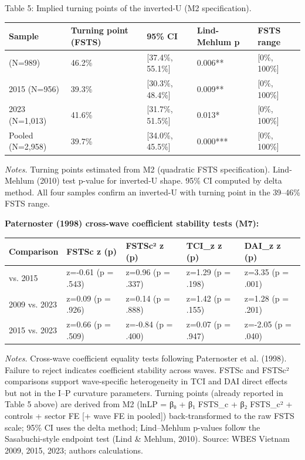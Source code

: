 \documentclass[12pt,a4paper]{article}
\begin{document}
Table 5: Implied turning points of the inverted-U (M2 specification).

\begin{longtable}[]{@{}lllll@{}}
\toprule\noalign{}
Sample & Turning point (FSTS) & 95\% CI & Lind-Mehlum p & FSTS range \\
\midrule\noalign{}
\endhead
\bottomrule\noalign{}
\endlastfoot
2009 (N=989) & 46.2\% & {[}37.4\%, 55.1\%{]} & 0.006** & {[}0\%,
100\%{]} \\
2015 (N=956) & 39.3\% & {[}30.3\%, 48.4\%{]} & 0.009** & {[}0\%,
100\%{]} \\
2023 (N=1,013) & 41.6\% & {[}31.7\%, 51.5\%{]} & 0.013* & {[}0\%,
100\%{]} \\
Pooled (N=2,958) & 39.7\% & {[}34.0\%, 45.5\%{]} & 0.000*** & {[}0\%,
100\%{]} \\
\end{longtable}

\emph{Notes.} Turning points estimated from M2 (quadratic FSTS
specification). Lind-Mehlum (2010) test p-value for inverted-U shape.
95\% CI computed by delta method. All four samples confirm an inverted-U
with turning point in the 39--46\% FSTS range.

\textbf{Paternoster (1998) cross-wave coefficient stability tests (M7):}

\begin{longtable}[]{@{}lllll@{}}
\toprule\noalign{}
Comparison & FSTSc z (p) & FSTSc² z (p) & TCI\_z z (p) & DAI\_z z (p) \\
\midrule\noalign{}
\endhead
\bottomrule\noalign{}
\endlastfoot
2009 vs. 2015 & z=-0.61 (p = .543) & z=0.96 (p = .337) & z=1.29 (p =
.198) & z=3.35 (p = .001) \\
2009 vs. 2023 & z=0.09 (p = .926) & z=0.14 (p = .888) & z=1.42 (p =
.155) & z=1.28 (p = .201) \\
2015 vs. 2023 & z=0.66 (p = .509) & z=-0.84 (p = .400) & z=0.07 (p =
.947) & z=-2.05 (p = .040) \\
\end{longtable}

\emph{Notes.} Cross-wave coefficient equality tests following
Paternoster et al. (1998). Failure to reject indicates coefficient
stability across waves. FSTSc and FSTSc² comparisons support
wave-specific heterogeneity in TCI and DAI direct effects but not in the
I--P curvature parameters. Turning points (already reported in Table 5
above) are derived from M2 (lnLP = β₀ + β₁ FSTS\_c + β₂ FSTS\_c² +
controls + sector FE {[}+ wave FE in pooled{]}) back-transformed to the
raw FSTS scale; 95\% CI uses the delta method; Lind--Mehlum p-values
follow the Sasabuchi-style endpoint test (Lind \& Mehlum, 2010). Source:
WBES Vietnam 2009, 2015, 2023; authors\textquotesingle{} calculations.
\end{document}

